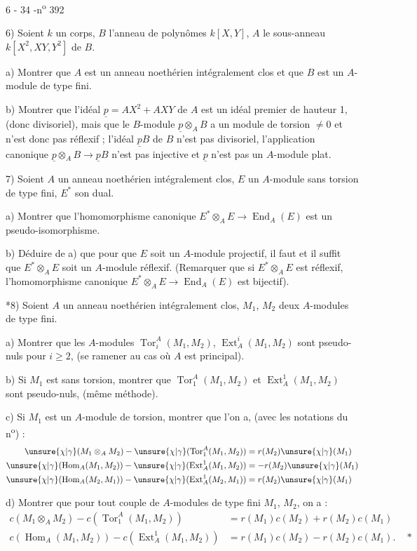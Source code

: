 \begin{center}6 - 34 -\hfill n\textsuperscript{o} 392\end{center}

6) Soient $k$ un corps, $B$ l'anneau de polynômes $k[X,Y]$, $A$ le sous-anneau $k[X^2,XY,Y^2]$ de $B$.

a) Montrer que $A$ est un anneau noethérien intégralement clos et que $B$ est un $A$-module de type fini.

b) Montrer que l'idéal $\underline p=AX^2+AXY$ de $A$ est un idéal premier de hauteur 1, (donc divisoriel), mais que le $B$-module $\underline p\otimes_A B$ a un module de torsion $\ne0$ et n'est donc pas réflexif ; l'idéal $\underline pB$ de $B$ n'est pas divisoriel, l'application canonique $\underline p\otimes_A B\longrightarrow\underline pB$ n'est pas injective et $\underline p$ n'est pas un $A$-module plat.

7) Soient $A$ un anneau noethérien intégralement clos, $E$ un $A$-module sans torsion de type fini, $E^*$ son dual.

a) Montrer que l'homomorphisme canonique $E^*\otimes_A E\longrightarrow\operatorname{End}_A(E)$ est un pseudo-isomorphisme.

b) Déduire de a) que pour que $E$ soit un $A$-module projectif, il faut et il suffit que $E^*\otimes_A E$ soit un $A$-module réflexif. (Remarquer que si $E^*\otimes_A E$ est réflexif, l'homomorphisme canonique $E^*\otimes_A E\longrightarrow\operatorname{End}_A(E)$ est bijectif).

*8) Soient $A$ un anneau noethérien intégralement clos, $M_1$, $M_2$ deux $A$-modules de type fini.

a) Montrer que les $A$-modules $\operatorname{Tor}_i^A(M_1,M_2)$, $\operatorname{Ext}_A^i(M_1,M_2)$ sont pseudo-nuls pour $i\geq2$, (se ramener au cas où $A$ est principal).

b) Si $M_1$ est sans torsion, montrer que $\operatorname{Tor}_1^A(M_1,M_2)$ et $\operatorname{Ext}_A^1(M_1,M_2)$ sont pseudo-nuls, (même méthode).

c) Si $M_1$ est un $A$-module de torsion, montrer que l'on a, (avec les notations du n\textsuperscript{o}\quad) :
\[
\begin{aligned}
\unsure{\chi|\gamma}(M_1\otimes_A M_2)-\unsure{\chi|\gamma}(\operatorname{Tor}_1^A(M_1,M_2))&=r(M_2)\unsure{\chi|\gamma}(M_1)\\
\unsure{\chi|\gamma}(\operatorname{Hom}_A(M_1,M_2))-\unsure{\chi|\gamma}(\operatorname{Ext}_A^1(M_1,M_2))&=-r(M_2)\unsure{\chi|\gamma}(M_1)\\
\unsure{\chi|\gamma}(\operatorname{Hom}_A(M_2,M_1))-\unsure{\chi|\gamma}(\operatorname{Ext}_A^1(M_2,M_1))&=r(M_2)\unsure{\chi|\gamma}(M_1)
\end{aligned}
\]

d) Montrer que pour tout couple de $A$-modules de type fini $M_1$, $M_2$, on a :
\[
\begin{aligned}
c(M_1\otimes_A M_2)-c(\operatorname{Tor}_1^A(M_1,M_2))&=r(M_1)c(M_2)+r(M_2)c(M_1)\\
c(\operatorname{Hom}_A(M_1,M_2))-c(\operatorname{Ext}_A^1(M_1,M_2))&=r(M_1)c(M_2)-r(M_2)c(M_1).\quad *
\end{aligned}
\]
